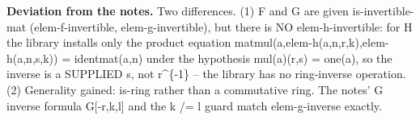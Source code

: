 %
\noindent\textbf{Deviation from the notes.} Two differences.  (1) F and G are given is-invertible-mat (elem-f-invertible, elem-g-invertible), but there is NO elem-h-invertible: for H the library installs only the product equation matmul(a,elem-h(a,n,r,k),elem-h(a,n,s,k)) = identmat(a,n) under the hypothesis mul(a)(r,s) = one(a), so the inverse is a SUPPLIED s, not r\textasciicircum{}\{-1\} -- the library has no ring-inverse operation.  (2) Generality gained: is-ring rather than a commutative ring.  The notes' G inverse formula G[-r,k,l] and the k /= l guard match elem-g-inverse exactly.
%
\renewcommand{\thethm}{3.8}
\begin{lem}\label{thm:clear-first-row}
%
\leavevmode
{}

\end{lem}
